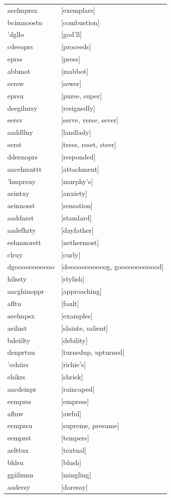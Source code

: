 \documentclass{article}
\begin{document}
\begin{tabular}{ll}
aeelmprsx & [exemplars] \\
bcimnoostu & [combustion] \\
'dgllo & [god'll] \\
cdeeoprs & [proceeds] \\
eprss & [press] \\
abbmot & [mabbot] \\
eersw & [sewer] \\
eprsu & [purse, super] \\
deegilnrsy & [resignedly] \\
eersv & [serve, verse, sever] \\
aaddllny & [landlady] \\
eerst & [trees, reset, steer] \\
ddeenoprs & [responded] \\
aacehmnttt & [attachment] \\
'hmprsuy & [murphy's] \\
aeintxy & [anxiety] \\
aeinnosst & [sensation] \\
aaddnrst & [standard] \\
aadefhrty & [dayfather] \\
eehmnorstt & [nethermost] \\
clruy & [curly] \\
dgooooooooooo & [dooooooooooog, goooooooooood] \\
hilssty & [stylish] \\
aacghinoppr & [approaching] \\
afltu & [fault] \\
aeelmpsx & [examples] \\
aeilnst & [slainte, salient] \\
bdeiilty & [debility] \\
denprtuu & [turnedup, upturned] \\
'cehiirs & [richie's] \\
ehikrs & [shriek] \\
aacdeinpr & [raincaped] \\
eemprss & [empress] \\
afluw & [awful] \\
eemprsu & [supreme, presume] \\
eemprst & [tempers] \\
aelttux & [textual] \\
bhlsu & [blush] \\
ggiilmnn & [mingling] \\
aadersy & [daresay] \\

\end{tabular}
\end{document}
